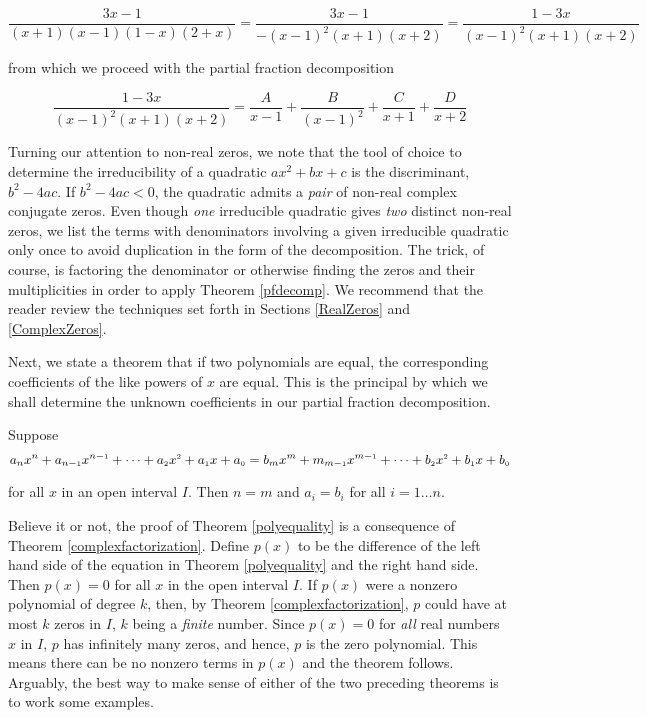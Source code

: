 \documentclass{ximera}
\begin{document}
\[\dfrac{3x-1}{(x+1)(x-1)(1-x)(2+x)} = \dfrac{3x-1}{-(x-1)^2(x+1)(x+2)} = \dfrac{1-3x}{(x-1)^2(x+1)(x+2)}\]

from which we proceed with the partial fraction decomposition

\[\dfrac{1-3x}{(x-1)^2(x+1)(x+2)} = \dfrac{A}{x-1} + \dfrac{B}{(x-1)^2} + \dfrac{C}{x+1} + \dfrac{D}{x+2}\]

Turning our attention to non-real zeros, we note that the tool of choice to determine the irreducibility of a quadratic  $ax^2+bx+c$ is the discriminant, $b^2-4ac$.  If $b^2 - 4ac < 0$, the quadratic admits a \textit{pair} of non-real complex conjugate zeros.  Even though \textit{one} irreducible quadratic gives \textit{two} distinct non-real zeros, we list the terms with denominators involving a given irreducible quadratic only once to avoid duplication in the form of the decomposition.  The trick, of course, is factoring the denominator or otherwise finding the zeros and their multiplicities in order to apply Theorem \ref{pfdecomp}.  We recommend that the reader review the techniques set forth in Sections \ref{RealZeros} and \ref{ComplexZeros}. 

Next, we state a theorem that if two polynomials are equal, the corresponding coefficients of the like powers of $x$ are equal.  This is the principal by which we shall determine the unknown coefficients in our partial fraction decomposition.

\smallskip


\begin{theorem}  \label{polyequality} Suppose \[a_{n} x^{n} + a_{n-\mbox{\tiny$1$}} x^{n-\mbox{\tiny$1$}} + \cdots + a_{\mbox{\tiny $2$}} x^{\mbox{\tiny $2$}} + a_{\mbox{\tiny $1$}} x + a_{\mbox{\tiny $0$}} = b_{m} x^{m} + m_{m-\mbox{\tiny$1$}} x^{m-\mbox{\tiny$1$}} + \cdots + b_{\mbox{\tiny $2$}} x^{\mbox{\tiny $2$}} + b_{\mbox{\tiny $1$}} x + b_{\mbox{\tiny $0$}}\]

for all $x$ in an open interval $I$.  Then $n=m$ and $a_{i} = b_{i}$ for all $i = 1 \ldots n$.


\end{theorem}



\smallskip

Believe it or not, the proof of Theorem \ref{polyequality} is a consequence of Theorem \ref{complexfactorization}.  Define $p(x)$ to be the difference of the left hand side of the equation in Theorem \ref{polyequality} and the right hand side.  Then $p(x) = 0$ for all $x$ in the open interval $I$.  If $p(x)$ were a nonzero polynomial of degree $k$, then, by Theorem \ref{complexfactorization}, $p$ could have at most $k$ zeros in $I$, $k$ being a \textit{finite} number.  Since $p(x) = 0$ for \textit{all} real numbers $x$ in $I$, $p$ has infinitely many zeros, and hence, $p$ is the zero polynomial.  This means there can be no nonzero terms in $p(x)$ and the theorem follows.  Arguably, the best way to make sense of either of the two preceding theorems is to work some examples.  
\end{document}
